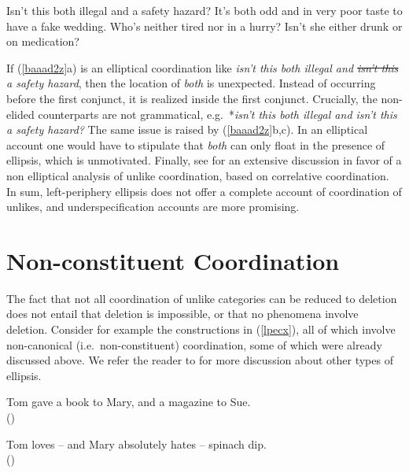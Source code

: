 {\begin{exe}
\ex
\begin{xlista}
\ex Isn't this both illegal and a safety hazard?
\ex It's both odd and in very poor taste to have a fake wedding.
\ex Who's neither tired nor in a hurry?
\ex Isn't she either drunk or on medication?
\end{xlista}\label{baaad2z}
\end{exe}



\noindent
 If (\ref{baaad2z}a) is an elliptical coordination
like \emph{isn't this both illegal and \sout{isn't this} a safety
hazard}, then the location of \emph{both} is unexpected. Instead of
occurring before the first conjunct, it is realized inside the first
conjunct. Crucially, the non-elided counterparts are not
grammatical, e.g.\ *\emph{isn't this both illegal and isn't this a
safety hazard?} The same issue is raised by (\ref{baaad2z}b,c). In
an elliptical account  one would have to stipulate
that \emph{both} can only float in the presence of ellipsis, which
is unmotivated.
Finally, see \citet{Mouret:07} for  an extensive discussion in favor of a non elliptical analysis of unlike coordination, based on correlative coordination.
In sum, left-periphery ellipsis does not 
offer a complete account of coordination of unlikes, and underspecification
accounts are more promising.




\section{Non-constituent Coordination}

The fact that not all coordination of unlike categories can be reduced to deletion  does not entail that
deletion is impossible, or that no phenomena involve deletion.
Consider for example the constructions in (\ref{lpecx}), all of which 
involve non-canonical (i.e.\ non-constituent) coordination, 
some of which were already discussed above. We refer the reader to  for more discussion about other types of ellipsis.

\begin{exe}
\ex
\begin{xlista}
\ex Tom gave a book to Mary, and a magazine to Sue.\\
()


\item Tom loves -- and Mary absolutely hates -- spinach dip.\\
()


\end{xlista}
\end{exe}}
